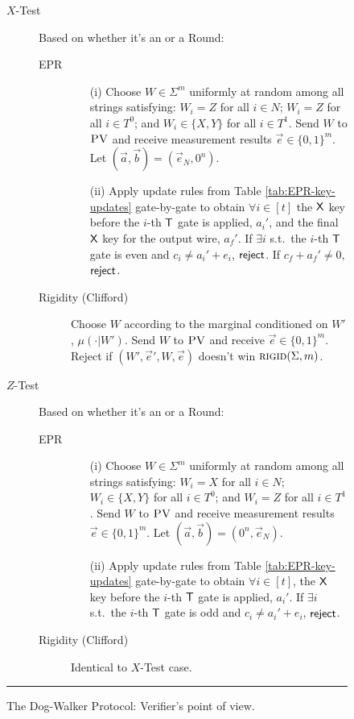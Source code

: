 \documentclass[11pt]{article}
\theoremstyle{remark}
\theoremstyle{definition}
\newcommand{\rigid}{\textsc{rigid}}
\newcommand{\pv}{\textsc{PV}}
\begin{document}
\begin{figure}[H]
\begin{description}
\begin{description}
\begin{enumerate}
		\end{enumerate}
	\end{description}
\item[$X$-Test] Based on whether it's an  or a  Round:
\begin{description}
	\item[EPR] 
	\begin{enumerate}
		\item[(i)] Choose $W\in\Sigma^m$ uniformly at random among all strings satisfying: $W_i=Z$ for all $i\in N$; $W_i=Z$ for all $i\in T^0$; and $W_i\in\{X,Y\}$ for all $i\in T^1$. Send $W$ to $\pv$ and receive measurement results $\vec{e}\in\{0,1\}^m$. Let $(\vec{a},\vec{b})=(\vec{e}_N,0^n)$. 
		\item[(ii)] Apply update rules from Table \ref{tab:EPR-key-updates} gate-by-gate to obtain $\forall i\in [t]$ the $\sf X$ key before the $i$-th $\sf T$ gate is applied, $a_i'$, and the final $\sf X$ key for the output wire, $a_f'$. 
If $\exists i$ s.t.\ the $i$-th $\sf T$ gate is even and $c_i\neq a_i'+e_i$, $\sf reject$. If $c_f+a_f'\neq 0$, $\sf reject$. 
	\end{enumerate}
	\item[Rigidity (Clifford)] Choose ${W}$ according to the marginal conditioned on ${W}'$, $\mu(\cdot|{W}')$. 
	Send ${W}$ to $\pv$ and receive $\vec{e}\in\{0,1\}^m$. Reject if   $({W}',\vec{e}',{W},\vec{e})$ doesn't win $\rigid(\Sigma,m)$. 
\end{description}

\item[$Z$-Test] Based on whether it's an  or a  Round:
\begin{description}
	\item[EPR] 
	\begin{enumerate}
		\item[(i)] Choose $W\in\Sigma^m$ uniformly at random among all strings satisfying: $W_i=X$ for all $i\in N$; $W_i\in\{X,Y\}$ for all $i\in T^0$; and $W_i=Z$ for all $i\in T^1$. Send $W$ to $\pv$ and receive measurement results $\vec{e}\in\{0,1\}^m$. Let $(\vec{a},\vec{b})=(0^n,\vec{e}_N)$.
		\item[(ii)] Apply update rules from Table \ref{tab:EPR-key-updates} gate-by-gate to obtain $\forall i\in [t]$, the $\sf X$ key before the $i$-th $\sf T$ gate is applied, $a_i'$. 
If $\exists i$ s.t.\ the $i$-th $\sf T$ gate is odd and $c_i\neq a_i'+e_i$, $\sf reject$. 
	\end{enumerate}
	\item[Rigidity (Clifford)] Identical to $X$-Test case.
\end{description}
\end{description}
\rule[2ex]{16.5cm}{0.5pt}\vspace{-.5cm}
\caption{The Dog-Walker Protocol: Verifier's point of view.}\label{fig:dogwalker-protocol-V}
\end{figure}
\end{document}
